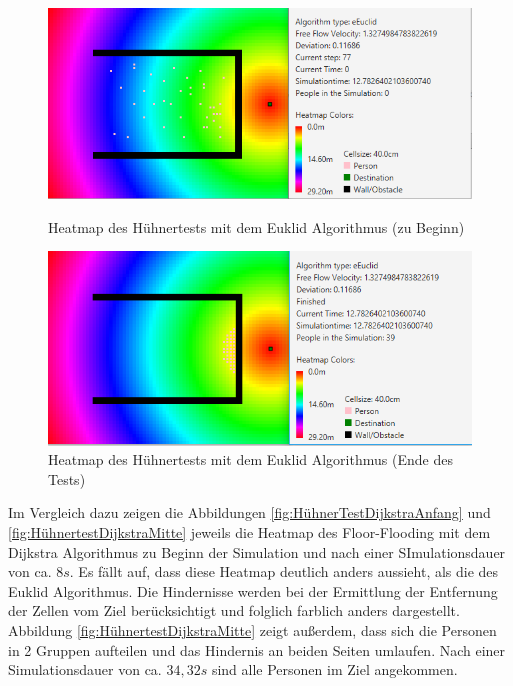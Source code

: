 \begin{figure}[!htb]
	\centering
	\begin{minipage}{.5\textwidth}
		\centering
		\includegraphics[width=\textwidth]{abbildungen/ChickenTest1BeginEuclid.png}
		\caption{Heatmap des Hühnertests mit dem Euklid Algorithmus (zu Beginn)}
		\label{fig:HühnerTestEuklidAnfang}
	\end{minipage}%
	\begin{minipage}{0.5\textwidth}
		\centering
		\includegraphics[width=\textwidth]{abbildungen/ChickenTest1EndEuclid.png}
		\caption{Heatmap des Hühnertests mit dem Euklid Algorithmus (Ende des Tests)}
		\label{fig:HühnertestEuklidEnde}
	\end{minipage}
\end{figure}

Im Vergleich dazu zeigen die Abbildungen \ref{fig:HühnerTestDijkstraAnfang} und \ref{fig:HühnertestDijkstraMitte} jeweils die Heatmap des Floor-Flooding mit dem Dijkstra Algorithmus zu Beginn der Simulation und nach einer SImulationsdauer von ca. $8s$. Es fällt auf, dass diese Heatmap deutlich anders aussieht, als die des Euklid Algorithmus. Die Hindernisse werden bei der Ermittlung der Entfernung der Zellen vom Ziel berücksichtigt und folglich farblich anders dargestellt. Abbildung \ref{fig:HühnertestDijkstraMitte} zeigt außerdem, dass sich die Personen in 2 Gruppen aufteilen und das Hindernis an beiden Seiten umlaufen. Nach einer Simulationsdauer von ca. $34,32s$ sind alle Personen im Ziel angekommen.

